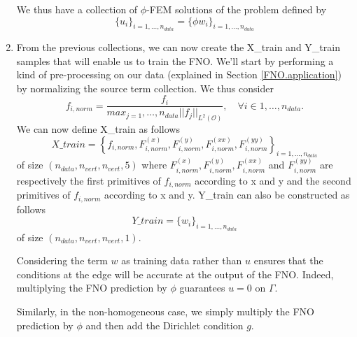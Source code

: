 \begin{enumerate}[label=\textbullet]
	We thus have a collection of $\phi$-FEM solutions of the problem defined by
	\begin{equation*}
		\{u_i\}_{i=1,\dots,n_{data}}=\{\phi w_i\}_{i=1,\dots,n_{data}}
	\end{equation*}
	
	\item From the previous collections, we can now create the X\_train and Y\_train samples that will enable us to train the FNO. We'll start by performing a kind of pre-processing on our data (explained in Section \ref{FNO.application}) by normalizing the source term collection. We thus consider
	\begin{equation*}
		f_{i,norm} = \frac{f_i}{max_{j=1},\dots,n_{data} ||f_j||_{L^2(\mathcal{O})}}, \quad \forall i\in 1,\dots,n_{data}.
	\end{equation*}
	We can now define X\_train as follows
	\begin{equation*}
		X\_train =  \left\{f_{i,norm},F_{i,norm}^{(x)},F_{i,norm}^{(y)},F_{i,norm}^{(xx)},F_{i,norm}^{(yy)}\right\}_{i=1,\dots,n_{data}}
	\end{equation*}
	of size $(n_{data},n_{vert},n_{vert},5)$ where $F_{i,norm}^{(x)},F_{i,norm}^{(y)},F_{i,norm}^{(xx)}$ and $F_{i,norm}^{(yy)}$ are respectively the first primitives of $f_{i,norm}$ according to x and y and the second primitives of $f_{i,norm}$ according to x and y.
	Y\_train can also be constructed as follows
	\begin{equation*}
		Y\_train = \{w_i\}_{i=1,\dots,n_{data}}
	\end{equation*}
	of size $(n_{data},n_{vert},n_{vert},1)$.
	
	\begin{Rem}
		Considering the term $w$ as training data rather than $u$ ensures that the conditions at the edge will be accurate at the output of the FNO. Indeed, multiplying the FNO prediction by $\phi$ guarantees $u=0$ on $\Gamma$. 
		
		Similarly, in the non-homogeneous case, we simply multiply the FNO prediction by $\phi$ and then add the Dirichlet condition $g$.
	\end{Rem}
	

\end{enumerate}
